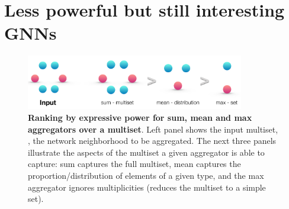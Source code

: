 
\vspace*{-5pt}

\section{ Less powerful but still interesting GNNs}
\label{sec:theory}


\begin{figure}[!t]
 \vspace{-0.2in}
    \centering
        \includegraphics[width=0.85\textwidth]{rank.pdf} 
    \caption{{\bf Ranking by expressive power for sum, mean and max aggregators over a multiset}. 
    Left panel shows the input multiset, \ie, the network neighborhood to be aggregated.
    The next three panels illustrate the aspects of the multiset a given aggregator is able to capture: sum captures the full multiset, mean captures the proportion/distribution of elements of a given type, and the max aggregator ignores multiplicities (reduces the multiset to a simple set).}
\label{fig:ranking}
\end{figure}

